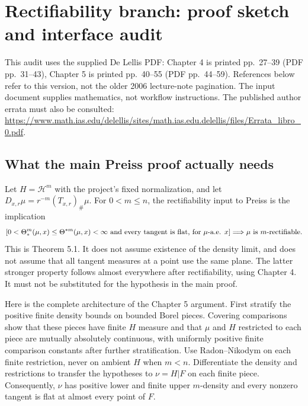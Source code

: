 \section{Rectifiability branch: proof sketch and interface audit}

This audit uses the supplied De Lellis PDF: Chapter 4 is printed pp.~27--39
(PDF pp.~31--43), Chapter 5 is printed pp.~40--55 (PDF pp.~44--59).
References below refer to this version, not the older 2006 lecture-note pagination.
The input document supplies mathematics, not workflow instructions.
The published author errata must also be consulted:
\url{https://www.math.ias.edu/delellis/sites/math.ias.edu.delellis/files/Errata_libro_0.pdf}.

\subsection{What the main Preiss proof actually needs}

Let $H=\mathcal H^m$ with the project's fixed normalization, and let
$D_{x,r}\mu=r^{-m}(T_{x,r})_\#\mu$.
For $0<m\leq n$, the rectifiability input to Preiss is the implication
\[
\left[0<\Theta_*^m(\mu,x)\leq\Theta^{*m}(\mu,x)<\infty
\ \hbox{and every tangent is flat, for $\mu$-a.e. $x$}\right]
\Longrightarrow \mu\text{ is }m\text{-rectifiable}.
\]
This is Theorem 5.1. It does not assume existence of the density limit,
and does not assume that all tangent measures at a point use the same plane.
The latter stronger property follows almost everywhere after rectifiability,
using Chapter 4. It must not be substituted for the hypothesis in the main proof.

Here is the complete architecture of the Chapter 5 argument.
First stratify the positive finite density bounds on bounded Borel pieces.
Covering comparisons show that these pieces have finite $H$ measure and that
$\mu$ and $H$ restricted to each piece are mutually absolutely continuous,
with uniformly positive finite comparison constants after further stratification.
Use Radon--Nikodym on each finite restriction, never on ambient $H$ when $m<n$.
Differentiate the density and restrictions to transfer the hypotheses to
$\nu=H|F$ on each finite piece. Consequently, $\nu$ has positive lower and
finite upper $m$-density and every nonzero tangent is flat at almost every
point of $F$.

